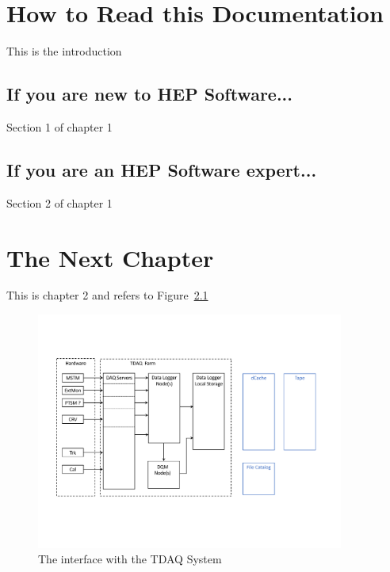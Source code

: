 

\chapter{How to Read this Documentation}
\label{ch:how-to-read}

This is the introduction

\section{If you are new to HEP Software...}

Section 1 of chapter 1


\section{If you are an HEP Software expert...}

Section 2 of chapter 1

\chapter{The Next Chapter}
\label{ch:next_chapter}

This is chapter 2 and refers to Figure~\ref{fig:interfaceTDAQ}

\begin{figure}[tbp]
\centering
\includegraphics[width=0.9\textwidth]{figures/interface_with_TDAQ.pdf}
\caption{The interface with the TDAQ System}
\label{fig:interfaceTDAQ}
\end{figure}


